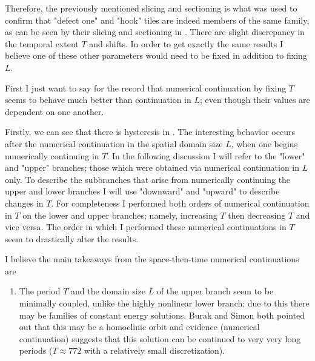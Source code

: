 \begin{description}
{\begin{description}
Therefore, the previously mentioned slicing and sectioning is what was used to confirm that "defect one" and "hook"
tiles are indeed members of the same family, as can be seen by their slicing and sectioning in .
There are slight discrepancy in the temporal extent $T$ and  shifts. In order to get exactly the same results I believe one of these other
parameters would need to be fixed in addition to fixing $L$.


\item[Dissection of bifurcation diagrams for defect family]

First I just want to say for the record that numerical continuation by fixing
$T$ seems to behave much better than continuation in $L$; even though their values
are dependent on one another.

Firstly, we can see that there is hysteresis in . The interesting
behavior occurs after the numerical continuation in the spatial domain size $L$, when one begins numerically
continuing in $T$. In the following discussion I will refer to the "lower" and "upper" branches; those which
were obtained via numerical continuation in $L$ only. To describe the subbranches that arise from numerically
continuing the upper and lower branches I will use "downward" and "upward" to describe changes in $T$. For completeness
I performed both orders of numerical continuation in $T$ on the lower and upper branches; namely, increasing $T$ then
decreasing $T$ and vice versa. The order in which I performed these numerical continuations in $T$ seem to drastically
alter the results.

I believe the main takeaways from the space-then-time numerical continuations are
\begin{enumerate}
\item The period $T$ and the domain size $L$ of the upper branch  seem to be minimally coupled,
unlike the highly nonlinear lower branch; due to this there may be families of constant energy solutions. Burak and Simon both pointed out that this may be a homoclinic orbit
and evidence (numerical continuation) suggests that this solution can be continued to very very long periods ($T \approx 772$ with
a relatively small discretization).



\end{enumerate}
\end{description}}
\end{description}
